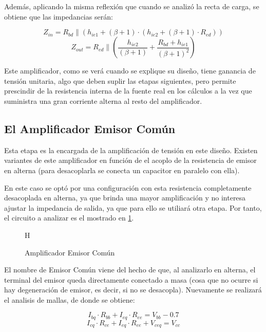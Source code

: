 Además, aplicando la misma reflexión que cuando se analizó la recta de carga, se obtiene que las impedancias serán:

\begin{equation}
    Z_{in} = R_{bd} \parallel (h_{ie1} + (\beta +1)\cdot(h_{ie2}+(\beta+1)\cdot R_{ed}))
    \label{ZinD}
\end{equation}
\begin{equation}
    Z_{out} = R_{ed} \parallel (\frac{h_{ie2}}{(\beta+1)} + \frac{R_{bd}+h_{ie1}}{(\beta+1)^2})
    \label{ZoutD}
\end{equation}

Este amplificador, como se verá cuando se explique su diseño, tiene ganancia de tensión unitaria, algo que deben suplir las etapas siguientes, pero permite prescindir de la resistencia interna de la fuente real en los cálculos a la vez que suministra una gran corriente alterna al resto del amplificador.

\subsection{El Amplificador Emisor Común}

Esta etapa es la encargada de la amplificación de tensión en este diseño. Existen variantes de este amplificador en función de el acoplo de la resistencia de emisor en alterna (para desacoplarla se conecta un capacitor en paralelo con ella).

En este caso se optó por una configuración con esta resistencia completamente desacoplada en alterna, ya que brinda una mayor amplificación y no interesa ajustar la impedancia de salida, ya que para ello se utiliará otra etapa. Por tanto, el circuito a analizar es el mostrado en \cref{fig:EmCom}.

\begin{figure}{H}
    \centering
    
    \caption{Amplificador Emisor Común}
    \label{fig:EmCom}
\end{figure}

El nombre de Emisor Común viene del hecho de que, al analizarlo en alterna, el terminal del emisor queda directamente conectado a masa (cosa que no ocurre si hay degeneración de emisor, es decir, si no se desacopla). Nuevamente se realizará el analisis de mallas, de donde se obtiene:

\begin{equation}
    I_{bq} \cdot R_{bb} + I_{eq}\cdot R_{ee} = V_{bb}-0.7
    \label{MEEC}
\end{equation}
\begin{equation}
    I_{cq}\cdot R_{ce} + I_{eq} \cdot R_{ee} + V_{ceq} = V_{cc}
    \label{MSEC}
\end{equation}

